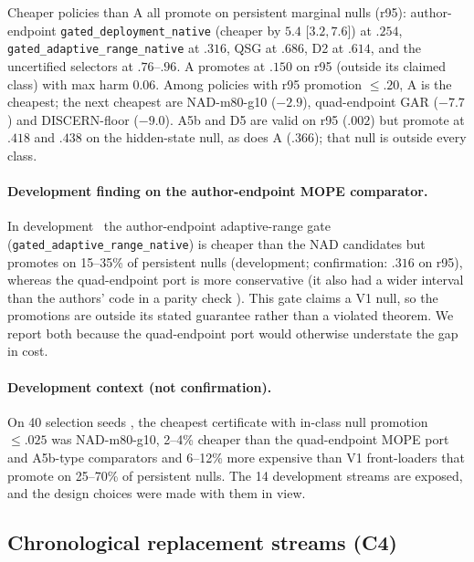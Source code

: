 Cheaper policies than A all promote on persistent marginal nulls (r95): author-endpoint
\texttt{gated\_deployment\_native} (cheaper by $5.4$ [$3.2,7.6$]) at $.254$,
\texttt{gated\_adaptive\_range\_native} at $.316$, QSG at $.686$, D2 at $.614$, and the uncertified
selectors at $.76$--$.96$. A promotes at $.150$ on r95 (outside its claimed class) with max harm $0.06$.
Among policies with r95 promotion $\le.20$, A is the cheapest; the next cheapest are NAD-m80-g10
($-2.9$), quad-endpoint GAR ($-7.7$) and DISCERN-floor ($-9.0$). A5b and D5 are valid on r95 ($.002$) but
promote at $.418$ and $.438$ on the hidden-state null, as does A ($.366$); that null is outside every class.

\paragraph{Development finding on the author-endpoint MOPE comparator.} In development
\devnote\ the author-endpoint adaptive-range gate (\texttt{gated\_adaptive\_range\_native}) is cheaper
than the NAD candidates but promotes on 15--35\% of persistent nulls (development; confirmation: $.316$ on r95), whereas the quad-endpoint port
is more conservative (it also had a wider interval than the authors' code in a parity check
\devnote). This gate claims a V1 null, so the promotions are outside its stated guarantee rather than
a violated theorem. We report both because the quad-endpoint port would otherwise understate the gap in cost.

\paragraph{Development context (not confirmation).} On 40 selection seeds \devnote, the cheapest
certificate with in-class null promotion $\le.025$ was NAD-m80-g10, 2--4\% cheaper than the
quad-endpoint MOPE port and A5b-type comparators and 6--12\% more expensive than V1 front-loaders that
promote on 25--70\% of persistent nulls. The 14 development streams are exposed, and the design
choices were made with them in view.

\subsection{Chronological replacement streams (C4)}

